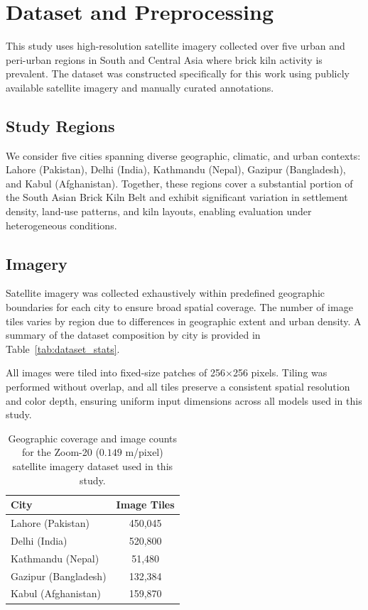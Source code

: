 \documentclass{article}
\theoremstyle{plain}
\theoremstyle{definition}
\theoremstyle{remark}
\begin{document}
\section{Dataset and Preprocessing}
This study uses high-resolution satellite imagery collected over five urban and peri-urban regions in South and Central Asia where brick kiln activity is prevalent. The dataset was constructed specifically for this work using publicly available satellite imagery and manually curated annotations.


\subsection{Study Regions}
We consider five cities spanning diverse geographic, climatic, and urban contexts: Lahore (Pakistan), Delhi (India), Kathmandu (Nepal), Gazipur (Bangladesh), and Kabul (Afghanistan). Together, these regions cover a substantial portion of the South Asian Brick Kiln Belt and exhibit significant variation in settlement density, land-use patterns, and kiln layouts, enabling evaluation under heterogeneous conditions.

\subsection{Imagery}
Satellite imagery was collected exhaustively within predefined geographic boundaries for each city to ensure broad spatial coverage. The number of image tiles varies by region due to differences in geographic extent and urban density. A summary of the dataset composition by city is provided in Table~\ref{tab:dataset_stats}.

All images were tiled into fixed-size patches of 256$\times$256 pixels. Tiling was performed without overlap, and all tiles preserve a consistent spatial resolution and color depth, ensuring uniform input dimensions across all models used in this study.

\begin{table}[h]
\centering
\caption{Geographic coverage and image counts for the Zoom-20 ($0.149$ m/pixel) satellite imagery dataset used in this study.}
\label{tab:dataset_stats}
\begin{tabular}{lc}
\toprule
\textbf{City} & \textbf{Image Tiles} \\
\midrule
Lahore (Pakistan) & 450{,}045 \\
Delhi (India) & 520{,}800 \\
Kathmandu (Nepal) & 51{,}480 \\
Gazipur (Bangladesh) & 132{,}384 \\
Kabul (Afghanistan) & 159{,}870 \\
\bottomrule
\end{tabular}
\label{tab:dataset}
\end{table}
\end{document}
